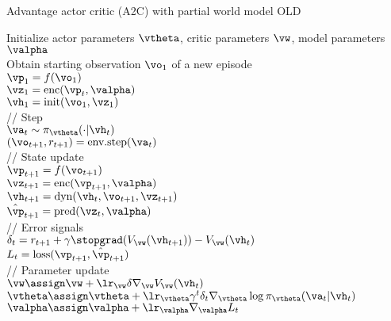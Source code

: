 \begin{algorithm}
\dontprintsemicolon
\caption{Advantage actor critic (A2C) with partial world model OLD}
Initialize actor parameters $\vtheta$,
critic parameters $\vw$,
model parameters $\valpha$\\
       {
         Obtain starting observation $\vo_1$ of a new episode \\
                     $\vp_1 = f(\vo_1)$  \\
             $\vz_{1} = \text{enc}(\vp_t, \valpha)$ \\
             $\vh_1 = \text{init}(\vo_1, \vz_1)$ \\
           {
            // Step \\
      $\va_t \sim \pi_{\vtheta}(\cdot|\vh_t)$ \\
      $(\vo_{t+1}, r_{t+1}) = \text{env.step}(\va_t)$ \\

            // State update \\
            $\vp_{t+1} = f(\vo_{t+1})$ \\
       $\vz_{t+1} = \text{enc}(\vp_{t+1}, \valpha)$ \\
       $\vh_{t+1} = \text{dyn}(\vh_{t}, \vo_{t+1}, \vz_{t+1})$ \\
            $\hat{\vp}_{t+1} = \text{pred}(\vz_t, \valpha)$ \\
            
        // Error signals \\
        $\delta_t = r_{t+1} + \gamma \stopgrad(V_{\vw}(\vh_{t+1})) - V_{\vw}(\vh_t)$ \\
        $L_t = \text{loss}(\vp_{t+1}, \hat{\vp}_{t+1})$ \\
       
        // Parameter update \\
         $\vw  \assign \vw + \lr_{\vw} \delta \nabla_{\vw} V_{\vw}(\vh_t)$ \\
        $\vtheta \assign \vtheta +
        \lr_{\vtheta} \gamma^t \delta_t \nabla_{\vtheta} \log \pi_{\vtheta}(\va_t|\vh_t)$ \\
        $\valpha \assign \valpha + \lr_{\valpha}  \nabla_{\valpha} L_t$ \\
       }
}
\end{algorithm}

